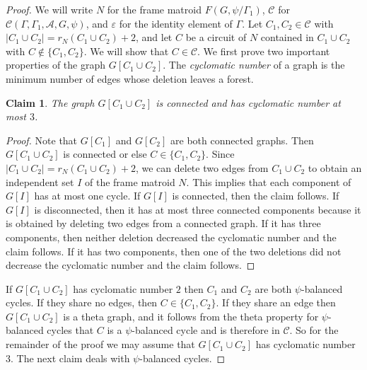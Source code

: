 \documentclass[10pt,a4paper]{amsart}
\newtheorem{claim}{Claim}
\newcommand{\cA}{\mathcal{A}}
\newcommand{\cC}{\mathcal{C}}
\newcommand{\ep}{\varepsilon}
\begin{document}
\begin{proof}
We will write $N$ for the frame matroid $F(G, \psi/\Gamma_1)$, $\cC$ for $\cC(\Gamma, \Gamma_1, \cA, G, \psi)$, and $\ep$ for the identity element of $\Gamma$.
Let $C_1, C_2 \in \cC$ with $|C_1 \cup C_2| = r_N(C_1 \cup C_2) + 2$, and let $C$ be a circuit of $N$ contained in $C_1 \cup C_2$ with $C \notin \{C_1, C_2\}$.
We will show that $C \in \cC$.
We first prove two important properties of the graph $G[C_1 \cup C_2]$.
The \emph{cyclomatic number} of a graph is the minimum number of edges whose deletion leaves a forest.

\begin{claim} \label{claim: cyclomatic number 3}
The graph $G[C_1 \cup C_2]$ is connected and has cyclomatic number at most $3$.
\end{claim}
\begin{proof}
Note that $G[C_1]$ and $G[C_2]$ are both connected graphs.
Then $G[C_1 \cup C_2]$ is connected or else $C \in \{C_1, C_2\}$.
Since $|C_1 \cup C_2| = r_N(C_1 \cup C_2) + 2$, we can delete two edges from $C_1 \cup C_2$ to obtain an independent set $I$ of the frame matroid $N$.
This implies that each component of $G[I]$ has at most one cycle.
If $G[I]$ is connected, then the claim follows.
If $G[I]$ is disconnected, then it has at most three connected components because it is obtained by deleting two edges from a connected graph.
If it has three components, then neither deletion decreased the cyclomatic number and the claim follows.
If it has two components, then one of the two deletions did not decrease the cyclomatic number and the claim follows.
\end{proof}


If $G[C_1 \cup C_2]$ has cyclomatic number $2$ then $C_1$ and $C_2$ are both $\psi$-balanced cycles.
If they share no edges, then $C \in \{C_1, C_2\}$.
If they share an edge then $G[C_1 \cup C_2]$ is a theta graph, and it follows from the theta property for $\psi$-balanced cycles that $C$ is a $\psi$-balanced cycle and is therefore in $\cC$.
So for the remainder of the proof we may assume that $G[C_1 \cup C_2]$ has cyclomatic number $3$.
The next claim deals with $\psi$-balanced cycles.






\end{proof}
\end{document}
